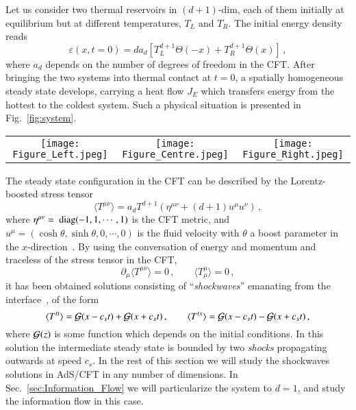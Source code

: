 \documentclass[epj]{webofc}
\newcommand{\diag}{{\rm \mbox{{  diag}}}}
\begin{document}
Let us consider two thermal reservoirs in $(d+1)$-dim, each of them initially at equilibrium but at different temperatures, $T_L$ and $T_R$. The initial energy density reads
\begin{equation}
\varepsilon(x,t=0) = d a_d \left[ T_L^{d+1} \Theta(-x) + T_R^{d+1} \Theta(x) \right] \,,
\end{equation}
where $a_d$ depends on the number of degrees of freedom in the CFT. After bringing the two systems into thermal contact at $t=0$, a spatially homogeneous steady state develops, carrying a heat flow $J_E$ which transfers energy from the hottest to the coldest system. Such a physical situation is presented in Fig.~\ref{fig:system}. 
\begin{figure*}[t]
\begin{tabular}{ccc}
\hspace{-0.4cm}\texttt{[image: Figure\_Left.jpeg]} &
\hspace{-0.7cm}\texttt{[image: Figure\_Centre.jpeg]} &
\hspace{-0.5cm}\texttt{[image: Figure\_Right.jpeg]} \\
\end{tabular}
\caption{Two isolated systems initially at equilibrium are put in contact at $t=0$. A spatially homogeneous non-equilibrium steady state develops at late times, and it carries an energy current $J_E = \langle T^{tx}\rangle_s$.}
\label{fig:system}
\end{figure*}
The steady state configuration in the CFT can be described by the Lorentz-boosted stress tensor
\begin{equation}
\langle T^{\mu\nu} \rangle = a_d T^{d+1} \left( \eta^{\mu\nu} + (d+1) u^\mu u^\nu \right) \,,   \label{eq:Tboosted}
\end{equation}
where $\eta^{\mu\nu} = \diag(-1,1,\cdots,1)$ is the CFT metric, and $u^\mu = (\cosh\theta, \sinh\theta, 0, \cdots, 0)$ is the fluid velocity with $\theta$ a boost parameter in the $x$-direction~\cite{Bhaseen:2013ypa}. By using the conversation of energy and momentum and traceless of the stress tensor in the CFT,
\begin{equation}
\partial_\mu \langle T^{\mu\nu}\rangle =0  \,, \qquad \langle T^{\mu}_{\mu}\rangle = 0  \,, \label{eq:hydro_eom}
\end{equation}
it has been obtained solutions consisting of ``{\it shockwaves}'' emanating from the interface~\cite{Smoller:1993,Bernard:2012je,Bhaseen:2013ypa,Chang:2013gba,Megias:2015tva}, of the form
\begin{equation}
\langle T^{tt} \rangle = {\cal G}(x - c_s t) + {\cal G}(x + c_st)  \,, \qquad \langle T^{tx} \rangle = {\cal G}(x - c_st) - {\cal G}(x + c_st)    \,, \label{eq:shockwave}
\end{equation}
where ${\cal G}(z)$ is some function which depends on the initial conditions. In this solution the intermediate steady state is bounded by two {\it shocks} propagating outwards at speed $c_s$. In the rest of this section we will study the shockwaves solutions in AdS/CFT in any number of dimensions. In Sec.~\ref{sec:Information_Flow} we will particularize the system to $d=1$, and study the information flow in this case.
\end{document}
